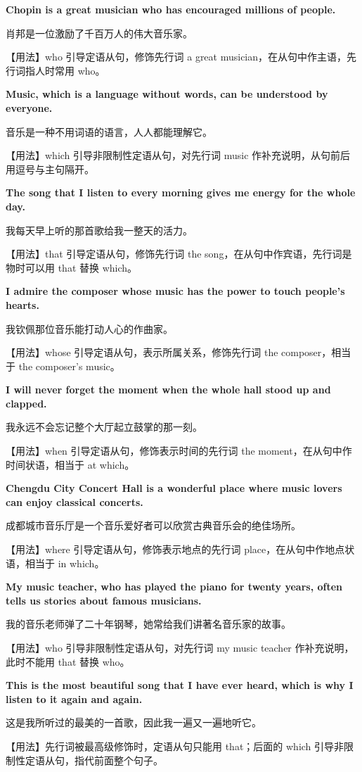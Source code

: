 \documentclass[UTF8,a4paper,11pt,oneside]{ctexbook}
\newcommand{\fansection}[1]{%
  \par\addvspace{2.4ex}%
  \Needspace{6\baselineskip}%
  \noindent{\sffamily\Large\bfseries\color{mainblue}#1}\par
  \nopagebreak
  \addvspace{0.2ex}%
  \noindent{\color{rulelight}\rule{\linewidth}{0.9pt}}\par
  \addvspace{0.9ex}%
  \nobreak
}
\newcommand{\fanpat}[3]{%
  \item{\bfseries #1}\par\nopagebreak
  {\small\color{textgray}#2}\par\nopagebreak
  {\footnotesize\color{accent!90!black}【用法】#3}\par
}
\begin{document}
\fansection{〇、本单元写作常用句型}
\begin{fanpatterns}

\fanpat{Chopin is a great musician who has encouraged millions of people.}{肖邦是一位激励了千百万人的伟大音乐家。}{who 引导定语从句，修饰先行词 a great musician，在从句中作主语，先行词指人时常用 who。}

\fanpat{Music, which is a language without words, can be understood by everyone.}{音乐是一种不用词语的语言，人人都能理解它。}{which 引导非限制性定语从句，对先行词 music 作补充说明，从句前后用逗号与主句隔开。}

\fanpat{The song that I listen to every morning gives me energy for the whole day.}{我每天早上听的那首歌给我一整天的活力。}{that 引导定语从句，修饰先行词 the song，在从句中作宾语，先行词是物时可以用 that 替换 which。}

\fanpat{I admire the composer whose music has the power to touch people's hearts.}{我钦佩那位音乐能打动人心的作曲家。}{whose 引导定语从句，表示所属关系，修饰先行词 the composer，相当于 the composer's music。}

\fanpat{I will never forget the moment when the whole hall stood up and clapped.}{我永远不会忘记整个大厅起立鼓掌的那一刻。}{when 引导定语从句，修饰表示时间的先行词 the moment，在从句中作时间状语，相当于 at which。}

\fanpat{Chengdu City Concert Hall is a wonderful place where music lovers can enjoy classical concerts.}{成都城市音乐厅是一个音乐爱好者可以欣赏古典音乐会的绝佳场所。}{where 引导定语从句，修饰表示地点的先行词 place，在从句中作地点状语，相当于 in which。}

\fanpat{My music teacher, who has played the piano for twenty years, often tells us stories about famous musicians.}{我的音乐老师弹了二十年钢琴，她常给我们讲著名音乐家的故事。}{who 引导非限制性定语从句，对先行词 my music teacher 作补充说明，此时不能用 that 替换 who。}

\fanpat{This is the most beautiful song that I have ever heard, which is why I listen to it again and again.}{这是我所听过的最美的一首歌，因此我一遍又一遍地听它。}{先行词被最高级修饰时，定语从句只能用 that；后面的 which 引导非限制性定语从句，指代前面整个句子。}

\end{fanpatterns}

\fansection{一、满分范文}
\end{document}
